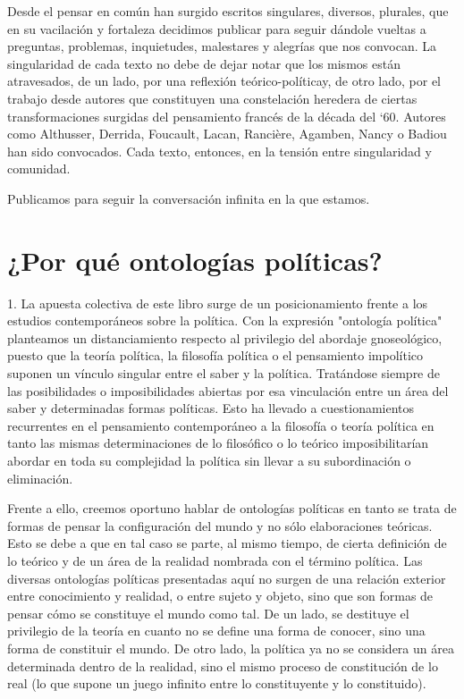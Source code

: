 \documentclass{book}
\begin{document}
Desde el pensar en común han surgido escritos singulares, diversos,
plurales, que en su vacilación y fortaleza decidimos publicar para
seguir dándole vueltas a preguntas, problemas, inquietudes, malestares y
alegrías que nos convocan. La singularidad de cada texto no debe de
dejar notar que los mismos están atravesados, de un lado, por una
reflexión teórico-políticay, de otro lado, por el trabajo desde autores
que constituyen una constelación heredera de ciertas transformaciones
surgidas del pensamiento francés de la década del `60. Autores como
Althusser, Derrida, Foucault, Lacan, Rancière, Agamben, Nancy o Badiou
han sido convocados. Cada texto, entonces, en la tensión entre
singularidad y comunidad.

Publicamos para seguir la conversación infinita en la que estamos.

\section{¿Por qué ontologías políticas?}

1. La apuesta colectiva de este libro surge de un posicionamiento frente a
los estudios contemporáneos sobre la política. Con la expresión
"ontología política" planteamos un distanciamiento respecto al
privilegio del abordaje gnoseológico, puesto que la teoría política, la
filosofía política o el pensamiento impolítico suponen un vínculo
singular entre el saber y la política. Tratándose siempre de las
posibilidades o imposibilidades abiertas por esa vinculación entre un
área del saber y determinadas formas políticas. Esto ha llevado a
cuestionamientos recurrentes en el pensamiento contemporáneo a la
filosofía o teoría política en tanto las mismas determinaciones de lo
filosófico o lo teórico imposibilitarían abordar en toda su complejidad
la política sin llevar a su subordinación o eliminación.

Frente a ello, creemos oportuno hablar de ontologías políticas en tanto
se trata de formas de pensar la configuración del mundo y no sólo
elaboraciones teóricas. Esto se debe a que en tal caso se parte, al
mismo tiempo, de cierta definición de lo teórico y de un área de la
realidad nombrada con el término política. Las diversas ontologías
políticas presentadas aquí no surgen de una relación exterior entre
conocimiento y realidad, o entre sujeto y objeto, sino que son formas de
pensar cómo se constituye el mundo como tal. De un lado, se destituye el
privilegio de la teoría en cuanto no se define una forma de conocer,
sino una forma de constituir el mundo. De otro lado, la política ya no
se considera un área determinada dentro de la realidad, sino el mismo
proceso de constitución de lo real (lo que supone un juego infinito
entre lo constituyente y lo constituido).
\end{document}
